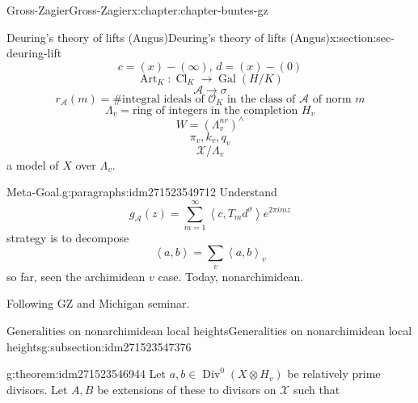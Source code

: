 \documentclass[oneside,10pt,]{book}
\numberwithin{equation}{section}
\newcommand{\pair}[2]{\left\langle #1, #2 \right\rangle}
\newcommand{\ints}{\mathcal{O}}
\DeclareMathOperator{\Div}{Div}
\DeclareMathOperator{\Cl}{Cl}
\newcommand{\Gal}[2]{\operatorname{Gal}(#1/#2)}
\begin{document}
\begin{chapterptx}{Gross-Zagier}{}{Gross-Zagier}{}{}{x:chapter:chapter-buntes-gz}
\begin{sectionptx}{Deuring's theory of lifts (Angus)}{}{Deuring's theory of lifts (Angus)}{}{}{x:section:sec-deuring-lift}
\begin{equation*}
c = (x) - (\infty ),\, d = (x) - (0)
\end{equation*}
%
\begin{equation*}
\operatorname{Art}_K \colon \Cl_K \to \Gal H K
\end{equation*}
%
\begin{equation*}
\mathscr A \to \sigma 
\end{equation*}
%
\begin{equation*}
r_{\mathscr A}(m) = \# \text{integral ideals of }\ints_K\text{ in the class of }\mathscr A \text{ of norm }m
\end{equation*}
%
\begin{equation*}
\Lambda _v = \text{ring of integers in the completion }H_v
\end{equation*}
%
\begin{equation*}
W = (\Lambda _v^{nr})^\wedge
\end{equation*}
%
\begin{equation*}
\pi _v, k_v, q_v
\end{equation*}
%
\begin{equation*}
\mathcal X/\Lambda _v
\end{equation*}
a model of \(X\) over \(\Lambda _v\).%
\begin{paragraphs}{Meta-Goal.}{g:paragraphs:idm271523549712}%
Understand%
\begin{equation*}
g_{\mathscr A}(z) = \sum_{m=1}^\infty \pair c {T_m d^\sigma } e^{2\pi  i m z}
\end{equation*}
strategy is to decompose%
\begin{equation*}
\pair a b = \sum_v \pair ab_v
\end{equation*}
so far, seen the archimidean \(v\) case. Today, nonarchimidean.%
\par
Following GZ and Michigan seminar.%
\end{paragraphs}%
%
%
\typeout{************************************************}
\typeout{************************************************}
%
\begin{subsectionptx}{Generalities on nonarchimidean local heights}{}{Generalities on nonarchimidean local heights}{}{}{g:subsection:idm271523547376}
\begin{theorem}{}{}{g:theorem:idm271523546944}%
Let \(a,b\in \Div^0(X \otimes H_v)\) be relatively prime divisors. Let \(A,B\) be extensions of these to divisors on \(\mathcal X\) such that%
\begin{equation*}

\end{equation*}
\end{theorem}
\end{subsectionptx}
\end{sectionptx}
\end{chapterptx}
\end{document}
